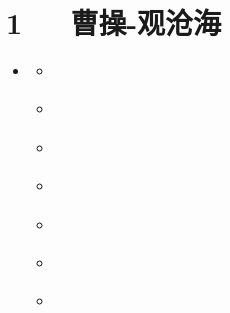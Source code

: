 \documentclass[letterpaper,10pt,english]{sphinxmanual}
\begin{document}
\chapter{1   曹操-观沧海}
\label{\detokenize{p01_u6563_u6587/_u66f9_u64cd-_u89c2_u6ca7_u6d77:id1}}\label{\detokenize{p01_u6563_u6587/_u66f9_u64cd-_u89c2_u6ca7_u6d77::doc}}
\begin{sphinxShadowBox}
\begin{itemize}
\item {} 
\label{\detokenize{p01_u6563_u6587/_u66f9_u64cd-_u89c2_u6ca7_u6d77:id10}}{\hyperref[\detokenize{p01_u6563_u6587/_u66f9_u64cd-_u89c2_u6ca7_u6d77:id1}]{}}
\begin{itemize}
\item {} 
\label{\detokenize{p01_u6563_u6587/_u66f9_u64cd-_u89c2_u6ca7_u6d77:id11}}{\hyperref[\detokenize{p01_u6563_u6587/_u66f9_u64cd-_u89c2_u6ca7_u6d77:id3}]{}}

\item {} 
\label{\detokenize{p01_u6563_u6587/_u66f9_u64cd-_u89c2_u6ca7_u6d77:id12}}{\hyperref[\detokenize{p01_u6563_u6587/_u66f9_u64cd-_u89c2_u6ca7_u6d77:id4}]{}}

\item {} 
\label{\detokenize{p01_u6563_u6587/_u66f9_u64cd-_u89c2_u6ca7_u6d77:id13}}{\hyperref[\detokenize{p01_u6563_u6587/_u66f9_u64cd-_u89c2_u6ca7_u6d77:id5}]{}}

\item {} 
\label{\detokenize{p01_u6563_u6587/_u66f9_u64cd-_u89c2_u6ca7_u6d77:id14}}{\hyperref[\detokenize{p01_u6563_u6587/_u66f9_u64cd-_u89c2_u6ca7_u6d77:id6}]{}}

\item {} 
\label{\detokenize{p01_u6563_u6587/_u66f9_u64cd-_u89c2_u6ca7_u6d77:id15}}{\hyperref[\detokenize{p01_u6563_u6587/_u66f9_u64cd-_u89c2_u6ca7_u6d77:id7}]{}}

\item {} 
\label{\detokenize{p01_u6563_u6587/_u66f9_u64cd-_u89c2_u6ca7_u6d77:id16}}{\hyperref[\detokenize{p01_u6563_u6587/_u66f9_u64cd-_u89c2_u6ca7_u6d77:id8}]{}}

\item {} 
\label{\detokenize{p01_u6563_u6587/_u66f9_u64cd-_u89c2_u6ca7_u6d77:id17}}{\hyperref[\detokenize{p01_u6563_u6587/_u66f9_u64cd-_u89c2_u6ca7_u6d77:id9}]{}}

\end{itemize}

\end{itemize}
\end{sphinxShadowBox}
\end{document}
